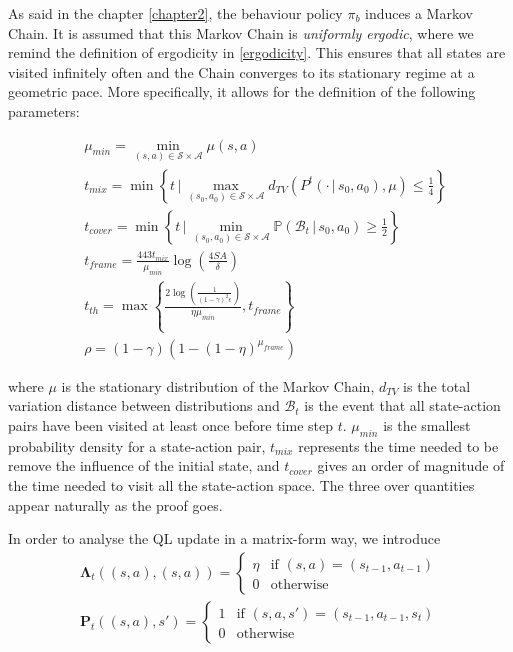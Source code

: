 As said in the chapter \ref{chapter2}, the behaviour policy $\pi_b$ induces a Markov Chain. It is assumed that this Markov Chain is \emph{uniformly ergodic}, where we remind the definition of ergodicity in \ref{ergodicity}. This ensures that all states are visited infinitely often and the Chain converges to its stationary regime at a geometric pace. More specifically, it allows for the definition of the following parameters:

\begin{align}
  &\mu_{min} = \min_{(s,a) \in \mathcal{S}\times \mathcal{A}} \mu (s,a)\\
  &t_{mix} = \min \left\{ t \,|\, \max_{(s_0,a_0) \in \mathcal{S}\times \mathcal{A}} d_{TV}(P^t(\cdot \,|\, s_0, a_0), \mu) \leq \frac{1}{4} \right\}\\
  &t_{cover} = \min \left\{ t \,|\, \min_{(s_0,a_0) \in \mathcal{S}\times \mathcal{A}} \mathbb{P} \left(\mathcal{B}_t \,|\, s_0, a_0 \right) \geq \frac{1}{2} \right\}\\
  &t_{frame} = \frac{443 t_{mix}}{\mu_{min}}\log\left( \frac{4SA}{\delta} \right)\\
  &t_{th} = \max \left\{ \frac{2 \log\left( \frac{1}{(1-\gamma)^2 \epsilon} \right) }{\eta \mu_{min}}, t_{frame} \right\}\label{eq:t_th}\\
  &\rho = (1-\gamma)(1 - (1 - \eta)^{\mu_{frame}}) \label{eq:rho}
\end{align}

where $\mu$ is the stationary distribution of the Markov Chain, $d_{TV}$ is the total variation distance between distributions and $\mathcal{B}_t$ is the event that all state-action pairs have been visited at least once before time step $t$. $\mu_{min}$ is the smallest probability density for a state-action pair, $t_{mix}$ represents the time needed to be remove the influence of the initial state, and $t_{cover}$ gives an order of magnitude of the time needed to visit all the state-action space. The three over quantities appear naturally as the proof goes.

In order to analyse the QL update in a matrix-form way, we introduce
\begin{align}
  \mathbf{\Lambda}_t ((s,a), (s,a)) = \begin{cases} \eta & \text{if }(s,a) = (s_{t-1}, a_{t-1})\\ 0 & \text{otherwise}\end{cases}\\
  \mathbf{P}_t((s,a), s') = \begin{cases}1 &\text{if } (s,a,s') = (s_{t-1}, a_{t-1}, s_t)\\ 0 & \text{otherwise}\end{cases}
\end{align}

